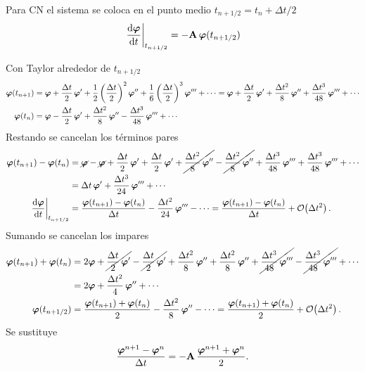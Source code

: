 Para CN el sistema se coloca en el punto medio $t_{n+1/2} = t_n + \Delta t/2$
\[
  \left.\frac{\mathrm{d}\bm{\varphi}}{\mathrm{d} t}\right|_{t_{n+1/2}} = -\mathbf{A}\,\bm{\varphi}(t_{n+1/2})
\]

Con Taylor alrededor de $t_{n+1/2}$
\begin{align*}
  \bm{\varphi}(t_{n+1}) &= \bm{\varphi} + \frac{\Delta t}{2}\,\bm{\varphi}' + \frac{1}{2}\left(\frac{\Delta t}{2}\right)^2\bm{\varphi}''
     + \frac{1}{6}\left(\frac{\Delta t}{2}\right)^3\bm{\varphi}''' + \cdots
   = \bm{\varphi} + \frac{\Delta t}{2}\,\bm{\varphi}' + \frac{\Delta t^2}{8}\,\bm{\varphi}''
     + \frac{\Delta t^3}{48}\,\bm{\varphi}''' + \cdots\\
  \bm{\varphi}(t_{n}) &= \bm{\varphi} - \frac{\Delta t}{2}\,\bm{\varphi}' + \frac{\Delta t^2}{8}\,\bm{\varphi}''
     - \frac{\Delta t^3}{48}\,\bm{\varphi}''' + \cdots
\end{align*}
Restando se cancelan los términos pares
\begin{align*}
  \bm{\varphi}(t_{n+1}) - \bm{\varphi}(t_n)
  &= \cancel{\bm{\varphi}} - \cancel{\bm{\varphi}} + \frac{\Delta t}{2}\,\bm{\varphi}' + \frac{\Delta t}{2}\,\bm{\varphi}'
     + \cancel{\frac{\Delta t^2}{8}\,\bm{\varphi}''} - \cancel{\frac{\Delta t^2}{8}\,\bm{\varphi}''}
     + \frac{\Delta t^3}{48}\,\bm{\varphi}''' + \frac{\Delta t^3}{48}\,\bm{\varphi}''' + \cdots\\
  &= \Delta t\,\bm{\varphi}' + \frac{\Delta t^3}{24}\,\bm{\varphi}''' + \cdots\\
  \left.\frac{\mathrm{d}\bm{\varphi}}{\mathrm{d} t}\right|_{t_{n+1/2}}
  &= \frac{\bm{\varphi}(t_{n+1}) - \bm{\varphi}(t_n)}{\Delta t} - \frac{\Delta t^2}{24}\,\bm{\varphi}''' - \cdots
   = \frac{\bm{\varphi}(t_{n+1}) - \bm{\varphi}(t_n)}{\Delta t} + \mathcal{O}\!\left(\Delta t^2\right).
\end{align*}
Sumando  se cancelan los impares
\begin{align*}
  \bm{\varphi}(t_{n+1}) + \bm{\varphi}(t_n)
  &= 2\bm{\varphi} + \cancel{\frac{\Delta t}{2}\,\bm{\varphi}'} - \cancel{\frac{\Delta t}{2}\,\bm{\varphi}'}
     + \frac{\Delta t^2}{8}\,\bm{\varphi}'' + \frac{\Delta t^2}{8}\,\bm{\varphi}''
     + \cancel{\frac{\Delta t^3}{48}\,\bm{\varphi}'''} - \cancel{\frac{\Delta t^3}{48}\,\bm{\varphi}'''} + \cdots\\
  &= 2\bm{\varphi} + \frac{\Delta t^2}{4}\,\bm{\varphi}'' + \cdots\\
  \bm{\varphi}(t_{n+1/2}) &= \frac{\bm{\varphi}(t_{n+1}) + \bm{\varphi}(t_n)}{2} - \frac{\Delta t^2}{8}\,\bm{\varphi}'' - \cdots
   = \frac{\bm{\varphi}(t_{n+1}) + \bm{\varphi}(t_n)}{2} + \mathcal{O}\!\left(\Delta t^2\right).
\end{align*}
Se sustituye 
\[
  \frac{\bm{\varphi}^{n+1} - \bm{\varphi}^{n}}{\Delta t} = -\mathbf{A}\,\frac{\bm{\varphi}^{n+1} + \bm{\varphi}^{n}}{2} .
\]

